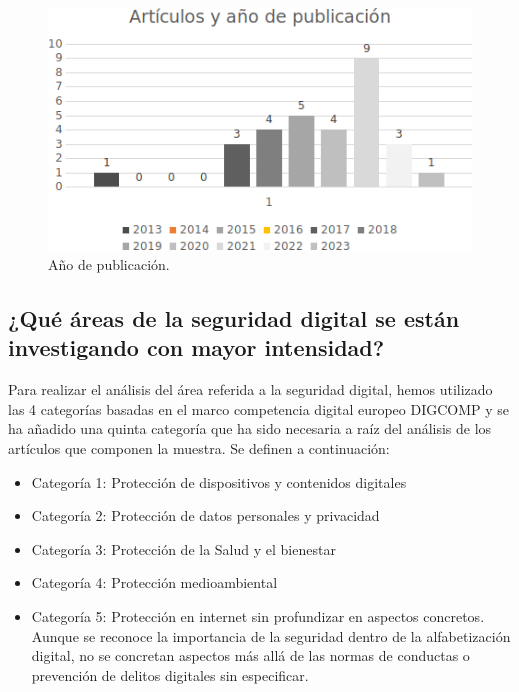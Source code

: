 \documentclass[spanish]{textolivre}
\begin{document}
\begin{figure}[h]
\centering
\begin{minipage}{0.65\textwidth}
\includegraphics[width=\textwidth]{Fig4.png}
\caption{Año de publicación.}
\label{fig4}
\end{minipage}
\end{figure}

\subsection{¿Qué áreas de la seguridad digital se están investigando con mayor intensidad?}\label{sec-modelo}
Para realizar el análisis del área referida a la seguridad digital, hemos utilizado las 4 categorías basadas en el marco competencia digital europeo DIGCOMP y se ha añadido una quinta categoría que ha sido necesaria a raíz del análisis de los artículos que componen la muestra. Se definen a continuación:

\begin{itemize}
    \item Categoría 1: Protección de dispositivos y contenidos digitales
    \item Categoría 2: Protección de datos personales y privacidad
    \item Categoría 3: Protección de la Salud y el bienestar
    \item Categoría 4: Protección medioambiental
    \item Categoría 5: Protección en internet sin profundizar en aspectos concretos. Aunque se reconoce la importancia de la seguridad dentro de la alfabetización digital, no se concretan aspectos más allá de las normas de conductas o prevención de delitos digitales sin especificar.
\end{itemize}
\end{document}
